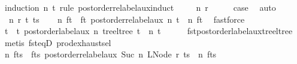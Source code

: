 \begin{isabellebody}
%
\isatagproof
{}\isamarkupfalse%
\ {\isacharparenleft}{\kern0pt}induction\ n\ t\ rule{\isacharcolon}{\kern0pt}\ postorder{\isacharunderscore}{\kern0pt}relabel{\isacharunderscore}{\kern0pt}aux{\isachardot}{\kern0pt}induct{\isacharparenright}{\kern0pt}\isanewline
\ \ \isamarkupfalse%
\ {\isacharparenleft}{\kern0pt}{}\ n\ r{\isacharparenright}{\kern0pt}\isanewline
\ \ \isamarkupfalse%
\ \isamarkupfalse%
\ {\isacharquery}{\kern0pt}case\ \isamarkupfalse%
\ auto\isanewline
{}\isamarkupfalse%
\isanewline
\ \ \isamarkupfalse%
\ {\isacharparenleft}{\kern0pt}{}\ n\ r\ t\ ts{\isacharparenright}{\kern0pt}\isanewline
\ \ \isamarkupfalse%
\ n{\isacharprime}{\kern0pt}\ f{\isacharunderscore}{\kern0pt}t\ \ f{\isacharunderscore}{\kern0pt}t{\isacharcolon}{\kern0pt}\ {\isachardoublequoteopen}postorder{\isacharunderscore}{\kern0pt}relabel{\isacharunderscore}{\kern0pt}aux\ n\ t\ {\isacharequal}{\kern0pt}\ {\isacharparenleft}{\kern0pt}n{\isacharprime}{\kern0pt}{\isacharcomma}{\kern0pt}\ f{\isacharunderscore}{\kern0pt}t{\isacharparenright}{\kern0pt}{\isachardoublequoteclose}\ \isamarkupfalse%
\ fastforce\isanewline
\ \ \isamarkupfalse%
\ \isamarkupfalse%
\ t{\isacharprime}{\kern0pt}\ \ t{\isacharprime}{\kern0pt}{\isacharcolon}{\kern0pt}\ {\isachardoublequoteopen}postorder{\isacharunderscore}{\kern0pt}label{\isacharunderscore}{\kern0pt}aux\ n\ {\isacharparenleft}{\kern0pt}tree{\isacharunderscore}{\kern0pt}ltree\ t{\isacharparenright}{\kern0pt}\ {\isacharequal}{\kern0pt}\ {\isacharparenleft}{\kern0pt}n{\isacharprime}{\kern0pt}{\isacharcomma}{\kern0pt}\ t{\isacharprime}{\kern0pt}{\isacharparenright}{\kern0pt}{\isachardoublequoteclose}\isanewline
\ \ \ \ \isamarkupfalse%
\ fst{\isacharunderscore}{\kern0pt}postorder{\isacharunderscore}{\kern0pt}label{\isacharunderscore}{\kern0pt}aux{\isacharunderscore}{\kern0pt}tree{\isacharunderscore}{\kern0pt}ltree\ \isamarkupfalse%
\ {\isacharparenleft}{\kern0pt}metis\ fst{\isacharunderscore}{\kern0pt}eqD\ prod{\isachardot}{\kern0pt}exhaust{\isacharunderscore}{\kern0pt}sel{\isacharparenright}{\kern0pt}\isanewline
\ \ \isamarkupfalse%
\ n{\isacharprime}{\kern0pt}{\isacharprime}{\kern0pt}\ f{\isacharunderscore}{\kern0pt}ts\ \ f{\isacharunderscore}{\kern0pt}ts{\isacharcolon}{\kern0pt}\ {\isachardoublequoteopen}postorder{\isacharunderscore}{\kern0pt}relabel{\isacharunderscore}{\kern0pt}aux\ {\isacharparenleft}{\kern0pt}Suc\ n{\isacharprime}{\kern0pt}{\isacharparenright}{\kern0pt}\ {\isacharparenleft}{\kern0pt}LNode\ r\ ts{\isacharparenright}{\kern0pt}\ {\isacharequal}{\kern0pt}\ {\isacharparenleft}{\kern0pt}n{\isacharprime}{\kern0pt}{\isacharprime}{\kern0pt}{\isacharcomma}{\kern0pt}\ f{\isacharunderscore}{\kern0pt}ts{\isacharparenright}{\kern0pt}{\isachardoublequoteclose}\ \isamarkupfalse%

\end{isabellebody}
